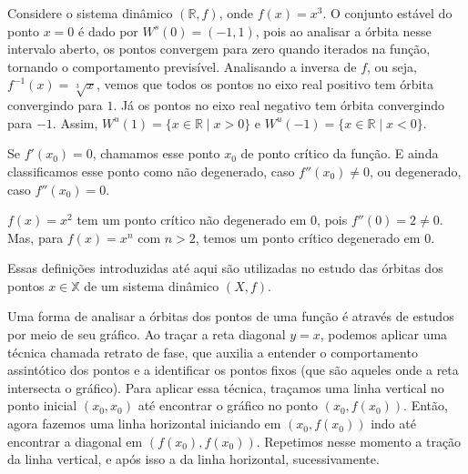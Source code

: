 \documentclass[../IC.tex]{subfiles}
\begin{document}
	\begin{exemplo}
		Considere o sistema dinâmico $(\mathbb{R}, f)$, onde $f(x) = x^3$. O conjunto estável do ponto $x = 0$ é dado por $W^s(0) = (-1, 1)$, pois ao analisar a órbita nesse intervalo aberto, os pontos convergem para zero quando iterados na função, tornando o comportamento previsível.
		Analisando a inversa de $f$, ou seja, $f^{-1}(x) = \sqrt[3]{x}$, vemos que todos os pontos no eixo real positivo tem órbita convergindo para $1$. Já os pontos no eixo real negativo tem órbita convergindo para $-1$. Assim, $W^u(1) = \{x \in \mathbb{R} \mid x > 0\}$ e $W^u(-1) = \{x \in \mathbb{R} \mid x < 0\}$.
	\end{exemplo}
	\begin{definicao}
		Se $f'(x_0) = 0$, chamamos esse ponto $x_0$ de ponto crítico da função. E ainda classificamos esse ponto como não degenerado, caso $f''(x_0) \neq 0$, ou degenerado, caso $f''(x_0) = 0$.
	\end{definicao}
	
	\begin{exemplo}
		$f(x)=x^2$ tem um ponto crítico não degenerado em 0, pois $f''(0) = 2 \neq 0$. Mas, para $f(x) = x^n$ com $n>2$, temos um ponto crítico degenerado em 0.
	\end{exemplo}
	
	Essas definições introduzidas até aqui são utilizadas no estudo das órbitas dos pontos $x \in \mathbb{X}$ de um sistema dinâmico $(X, f)$.
	
	Uma forma de analisar a órbitas dos pontos de uma função é através de estudos por meio de seu gráfico. Ao traçar a reta diagonal $y = x$, podemos aplicar uma técnica chamada retrato de fase, que auxilia a entender o comportamento assintótico dos pontos e a identificar os pontos fixos (que são aqueles onde a reta intersecta o gráfico). Para aplicar essa técnica, traçamos uma linha vertical no ponto inicial $(x_0, x_0)$ até encontrar o gráfico no ponto $(x_0, f(x_0))$. Então, agora fazemos uma linha horizontal iniciando em $(x_0, f(x_0))$ indo até encontrar a diagonal em $(f(x_0), f(x_0))$. Repetimos nesse momento a tração da linha vertical, e após isso a da linha horizontal, sucessivamente.
	
\end{document}
